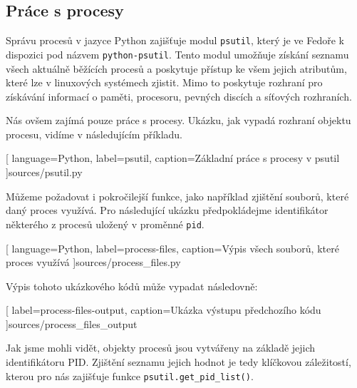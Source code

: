 \documentclass[
  field=inf,
  biblatex,
  glossaries,
  index
]{kidiplom}
\begin{document}
	\subsection{Práce s procesy}
	Správu procesů v jazyce Python zajišťuje modul \texttt{psutil}, který je ve Fedoře k dispozici pod názvem \texttt{python-psutil}. Tento modul umožňuje získání seznamu všech aktuálně běžících procesů a poskytuje přístup ke všem jejich atributům, které lze v linuxových systémech zjistit. Mimo to poskytuje rozhraní pro získávání informací o paměti, procesoru, pevných discích a síťových rozhraních.

	Nás ovšem zajímá pouze práce s procesy. Ukázku, jak vypadá rozhraní objektu procesu, vidíme v následujícím příkladu.

	
	[
		language={Python},
		label=psutil,
		caption={Základní práce s procesy v psutil}
	]{sources/psutil.py}

	Můžeme požadovat i pokročilejší funkce, jako například zjištění souborů, které daný proces využívá. Pro následující ukázku předpokládejme identifikátor některého z procesů uložený v proměnné \texttt{pid}.

	
	[
		language={Python},
		label=process-files,
		caption={Výpis všech souborů, které proces využívá}
	]{sources/process_files.py}

	Výpis tohoto ukázkového kódů může vypadat následovně:

	
	[
		label=process-files-output,
		caption={Ukázka výstupu předchozího kódu}
	]{sources/process_files_output}

	Jak jsme mohli vidět, objekty procesů jsou vytvářeny na základě jejich identifikátoru PID\@. Zjištění seznamu jejich hodnot je tedy klíčkovou záležitostí, kterou pro nás zajišťuje funkce \texttt{psutil.get\_pid\_list()}.
\end{document}
